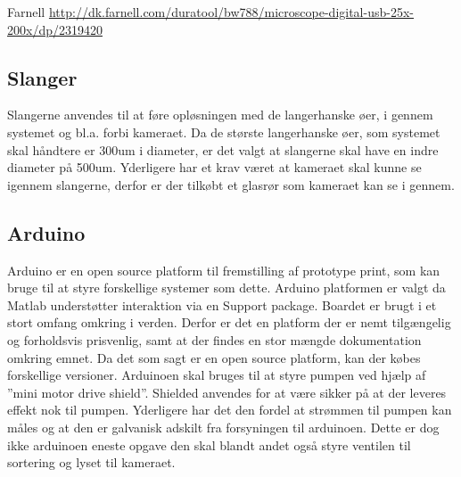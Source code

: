 Farnell
\url{http://dk.farnell.com/duratool/bw788/microscope-digital-usb-25x-200x/dp/2319420}
 
\subsection{Slanger}
Slangerne anvendes til at føre opløsningen med de langerhanske øer, i gennem systemet og bl.a. forbi kameraet. Da de største langerhanske øer, som systemet skal håndtere er 300um i diameter, er det valgt at slangerne skal have en indre diameter på 500um. Yderligere har et krav været at kameraet skal kunne se igennem slangerne, derfor er der tilkøbt et glasrør som kameraet kan se i gennem. 

\subsection{Arduino}
Arduino er en open source platform til fremstilling af prototype print, som kan bruge til at styre forskellige systemer som dette. Arduino platformen er valgt da Matlab understøtter interaktion via en Support package. Boardet er brugt i et stort omfang omkring i verden. Derfor er det en platform der er nemt tilgængelig og forholdsvis prisvenlig, samt at der findes en stor mængde dokumentation omkring emnet. Da det som sagt er en open source platform, kan der købes forskellige versioner. 
Arduinoen skal bruges til at styre pumpen ved hjælp af ”mini motor drive shield”. Shielded anvendes for at være sikker på at der leveres effekt nok til pumpen. Yderligere har det den fordel at strømmen til pumpen kan måles og at den er galvanisk adskilt fra forsyningen til arduinoen. Dette er dog ikke arduinoen eneste opgave den skal blandt andet også styre ventilen til sortering og lyset til kameraet.


